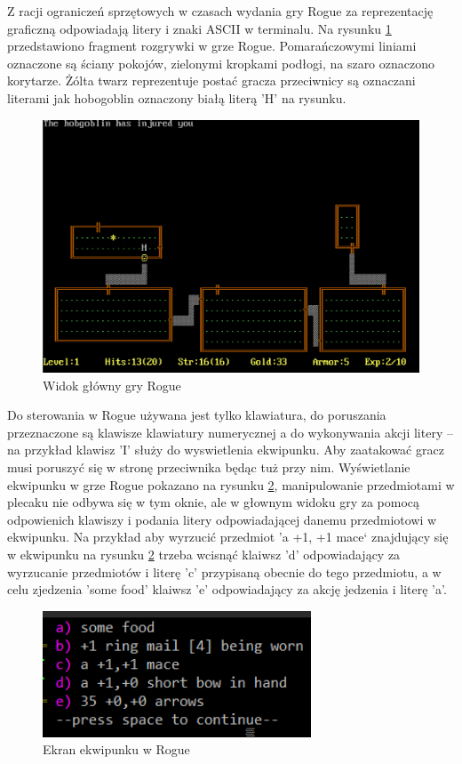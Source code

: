 \documentclass[12pt,twoside]{article}
\begin{document}
Z racji ograniczeń sprzętowych w czasach wydania gry Rogue za reprezentację graficzną odpowiadają litery i znaki ASCII w terminalu. Na rysunku \ref{Rogue:scr1} przedstawiono fragment rozgrywki w grze Rogue. Pomarańczowymi liniami oznaczone są ściany pokojów, zielonymi kropkami podłogi, na szaro oznaczono korytarze. Żólta twarz reprezentuje postać gracza przeciwnicy są oznaczani literami jak hobogoblin oznaczony białą literą 'H' na rysunku.

\FloatBarrier
\begin{figure}[h]
	\centering
	\includegraphics[width=12cm]{images/rogue/scr1.png}
	\caption{Widok główny gry Rogue}
	\label{Rogue:scr1}
\end{figure}
\FloatBarrier

Do sterowania w Rogue używana jest tylko klawiatura, do poruszania przeznaczone są klawisze klawiatury numerycznej a do wykonywania akcji litery -- na przykład klawisz 'I' służy do wyswietlenia ekwipunku. Aby zaatakować gracz musi poruszyć się w stronę przeciwnika będąc tuż przy nim. Wyświetlanie ekwipunku w grze Rogue pokazano na rysunku \ref{Rogue:scr2}, manipulowanie przedmiotami w plecaku nie odbywa się w tym oknie, ale w głownym widoku gry za pomocą odpowienich klawiszy i podania litery odpowiadającej danemu przedmiotowi w ekwipunku. Na przykład aby wyrzucić przedmiot 'a +1, +1 mace` znajdujący się w ekwipunku na rysunku \ref{Rogue:scr2} trzeba wcisnąć klaiwsz 'd' odpowiadający za wyrzucanie przedmiotów i literę 'c' przypisaną obecnie do tego przedmiotu, a w celu zjedzenia 'some food' klaiwsz 'e' odpowiadający za akcję jedzenia i literę 'a'. 

\FloatBarrier
\begin{figure}[h]
	\centering
	\includegraphics[width=8cm]{images/rogue/scr2.png}
	\caption{Ekran ekwipunku w Rogue}
	\label{Rogue:scr2}
\end{figure}
\FloatBarrier
\end{document}
